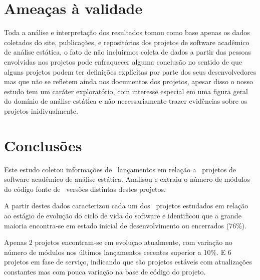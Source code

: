 
\section{Ameaças à validade} %

Toda a análise e interpretação dos resultados tomou como base apenas os dados
coletados do site, publicações, e repositórios dos projetos de software
acadêmico de análise estática, o fato de não incluirmos coleta de dados a
partir das pessoas envolvidas nos projetos pode enfraquecer alguma conclusão no
sentido de que alguns projetos podem ter definições explícitas por parte dos
seus desenvolvedores mas que não se refletem ainda nos documentos dos projetos,
apesar disso o nosso estudo tem um caráter exploratório, com interesse especial em
uma figura geral do domínio de análise estática e não necessariamente trazer
evidências sobre os projetos inidivualmente.


\section{Conclusões} \label{estudo3:conclusoes} %

Este estudo coletou informações de \ReleasesCount \ lançamentos em relação a
\ProjectsWithReleasesCount \ projetos de software acadêmico de análise
estática. Analisou e extraiu o número de módulos do código fonte de
\ReleasesMetricsCount \ versões distintas destes projetos.

A partir destes dados caracterizou cada um dos \SoftwareCount \ projetos
estudados em relação ao estágio de evolução do ciclo de vida do software e
identificou que a grande maioria encontra-se em estado inicial de
desenvolvimento ou encerrados (76\%).

Apenas 2 projetos encontram-se em evoluçao atualmente, com variação no número
de módulos nos últimos lançamentos recentes superior a 10\%. E 6 projetos em
fase de serviço, indicando que são projetos estáveis com atualizações
constantes mas com pouca variação na base de código do projeto.




